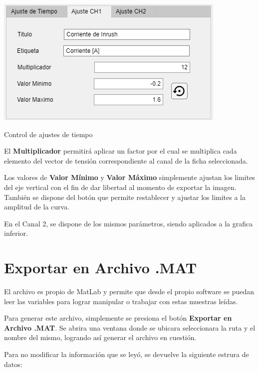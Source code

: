 \begin{center}
	\includegraphics[width=0.4\columnwidth]{images/Ajuste_Canal1}
	\captionsetup{type=figure}
	\caption{Control de ajustes de tiempo}
	\label{fig:005}
\end{center}

El \textbf{Multiplicador} permitirá aplicar un factor por el cual se multiplica cada elemento del vector de tensión correspondiente al canal de la ficha seleccionada.

Los valores de \textbf{Valor Mínimo} y \textbf{Valor Máximo} simplemente ajustan los limites del eje vertical con el fin de dar libertad al momento de exportar la imagen. También se dispone del botón que permite restablecer y ajustar los limites a la amplitud de la curva.

En el Canal 2, se dispone de los mismos parámetros, siendo aplicados a la grafica inferior.

\section{Exportar en Archivo .MAT} \label{Exportar en Archivo .MAT}

El archivo  es propio de MatLab y permite que desde el propio software se puedan leer las variables para lograr manipular o trabajar con estas muestras leídas.

Para generar este archivo, simplemente se presiona el botón \textbf{Exportar en Archivo .MAT}. Se abrira una ventana donde se ubicara seleccionara la ruta y el nombre del mismo, logrando así generar el archivo en cuestión.

Para no modificar la información que se leyó, se devuelve la siguiente estrura de datos:

